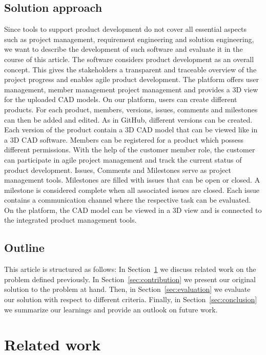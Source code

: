     \subsection*{Solution approach}
    Since tools to support product development do not cover all essential aspects such as project management, requirement engineering and solution engineering, we want to describe the development of such software and evaluate it in the course of this article. The software considers product development as an overall concept. This gives the stakeholders a transparent and traceable overview of the project progress and enables agile product development.
    The platform offers user management, member management project management and provides a 3D view for the uploaded CAD models. On our platform, users can create different products. For each product, members, versions, issues, comments and milestones can then be added and edited. As in GitHub, different versions can be created. Each version of the product contain a 3D CAD model that can be viewed like in a 3D CAD software. Members can be registered for a product which possess different permissions. With the help of the customer member role, the customer can participate in agile project management and track the current status of product development. Issues, Comments and Milestones serve as project management tools. Milestones are filled with issues that can be open or closed. A milestone is considered complete when all associated issues are closed. Each issue contains a communication channel where the respective task can be evaluated. On the platform, the CAD model can be viewed in a 3D view and is connected to the integrated product management tools.

    \subsection*{Outline}
    This article is structured as follows:
    In Section~\ref{sec:differentiation} we discuss related work on the problem defined previously.
    In Section~\ref{sec:contribution} we present our original solution to the problem at hand.
    Then, in Section~\ref{sec:evaluation} we evaluate our solution with respect to different criteria.
    Finally, in Section~\ref{sec:conclusion} we summarize our learnings and provide an outlook on future work.
    
    \section{Related work}
    \label{sec:differentiation}

